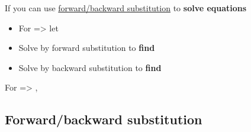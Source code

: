 \hSep %

If  you can use \underline{forward/backward substitution} to
\textbf{solve equations}

\begin{itemize}

      \item
            For  => let 
      \item
            Solve  by forward substitution to \textbf{find
                  }
      \item
            Solve  by backward substitution to \textbf{find
                  }
\end{itemize}

For  =>
,

\subsection*{Forward/backward substitution}

